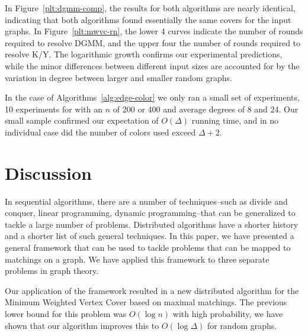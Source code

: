 \documentclass[conference, 10pt, letter]{IEEEtran}
\begin{document}
In Figure~\ref{plt:dgmm-comp}, the results for both algorithms are nearly identical, indicating that both algorithms found essentially the same covers for the input graphs. In Figure~\ref{plt:mwvc-rn}, the lower 4 curves indicate the number of rounds required to resolve DGMM, and the upper four the number of rounds required to resolve K/Y. The logarithmic growth confirms our experimental predictions, while the minor differences between different input sizes are accounted for by the variation in degree between larger and smaller random graphs.

In the case of Algorithms~\ref{alg:edge-color} we only ran a small set of experiments, 10 experiments for with an $n$ of 200 or 400 and average degrees of 8 and 24. Our small sample confirmed our expectation of $O(\Delta)$ running time, and in no individual case did the number of colors used exceed $\Delta + 2$.

\section{Discussion}

In sequential algorithms, there are a number of techniques--such as divide and conquer, linear programming, dynamic programming--that can be generalized to tackle a large number of problems. Distributed algorithms have a shorter history and a shorter list of such general techniques. In this paper, we have presented a general framework that can be used to tackle problems that can be mapped to matchings on a graph. We have applied this framework to three separate problems in graph theory.

Our application of the framework resulted in a new distributed algorithm for the Minimum Weighted Vertex Cover based on maximal matchings. The previous lower bound for this problem was $O(\log n)$ with high probability, we have shown that our algorithm improves this to $O(\log \Delta)$ for random graphs. 



\end{document}
